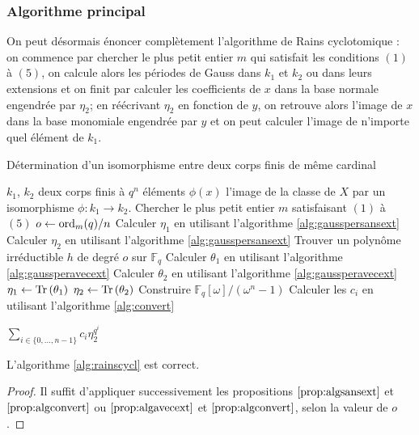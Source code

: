 \documentclass[a4paper]{article} %
\numberwithin{section}{part}
\numberwithin{equation}{section}
\newcommand\GF[1]{\mathbb{F}_{#1}}
\newcommand\Tr[1]{\textup{Tr}\left(#1\right)}
\newcommand\ord[2]{\textup{ord}_{#1}(#2)}
\begin{document}
\subsubsection*{Algorithme principal}

On peut désormais énoncer complètement l'algorithme de Rains cyclotomique : on
commence par chercher le plus petit entier $m$ qui satisfait les conditions
$(1)$ à $(5)$, on calcule alors les périodes de Gauss dans $k_1$ et $k_2$ ou
dans leurs extensions et on finit par calculer les coefficients de $x$ dans la
base normale engendrée par $\eta_2$; en réécrivant $\eta_2$ en fonction de $y$,
on retrouve alors l'image de $x$ dans la base monomiale engendrée par $y$ et on
peut calculer l'image de n'importe quel élément de $k_1$.

\begin{algorithm}
\caption{Détermination d'un isomorphisme entre deux corps finis de même
cardinal}
\label{alg:rainscycl}
\begin{algorithmic}[1]
\REQUIRE $k_1$, $k_2$ deux corps finis à $q^n$ éléments
\ENSURE $\phi(x)$ l'image de la classe de $X$ par un isomorphisme $\phi : k_1
\to k_2$. 
\bigskip
\STATE Chercher le plus petit entier $m$ satisfaisant $(1)$ à $(5)$
\STATE $o \leftarrow \ord{m}{q}/n$
    \STATE Calculer $\eta_1$ en utilisant l'algorithme \ref{alg:gausspersansext}
    \STATE Calculer $\eta_2$ en utilisant l'algorithme \ref{alg:gausspersansext}
\ELSE
    \STATE Trouver un polynôme irréductible $h$ de degré $o$ sur $\GF{q}$
    \STATE Calculer $\theta_1$ en utilisant l'algorithme 
    \ref{alg:gaussperavecext}
    \STATE Calculer $\theta_2$ en utilisant l'algorithme 
    \ref{alg:gaussperavecext}
    \STATE $\eta_1 \leftarrow \Tr{\theta_1}$
    \STATE $\eta_2 \leftarrow \Tr{\theta_2}$
\ENDIF
\STATE Construire $\GF{q}[\omega]/(\omega^n - 1)$
\STATE Calculer les $c_i$ en utilisant l'algorithme \ref{alg:convert}

\RETURN $\sum_{i\in\lbrace{0,\dots,n-1}\rbrace}{c_i\eta_2^{q^i}}$

\end{algorithmic}
\end{algorithm}

\begin{prop}
L'algorithme \ref{alg:rainscycl} est correct.
\end{prop}
\begin{proof}
Il suffit d'appliquer successivement les propositions $\ref{prop:algsansext}$ et
$\ref{prop:algconvert}$ ou $\ref{prop:algavecext}$ et $\ref{prop:algconvert}$,
selon la valeur de $o$.
\end{proof}
\end{document}
